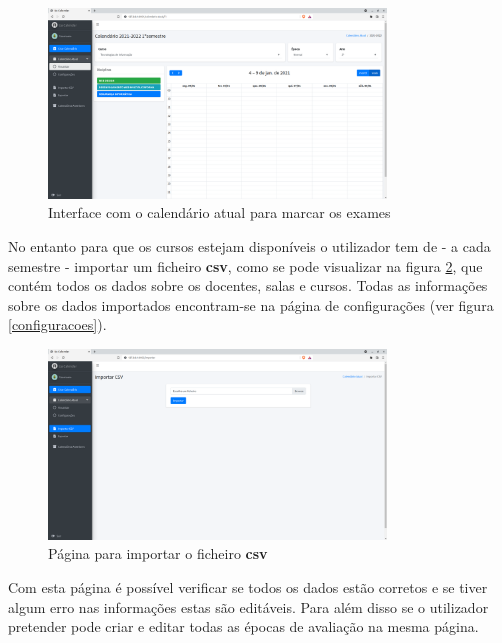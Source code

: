 \documentclass[11pt, twoside]{report}
\begin{document}
	\begin{figure}[H] 
		\centering 							\includegraphics[width=0.8\textwidth,height=0.8\textheight,keepaspectratio]{image/PrototipoAFNF/VerCalendarioAtual}
		\caption{Interface com o calendário atual para marcar os exames}
		\label{marcarExames}
	\end{figure}
	
	No entanto para que os cursos estejam disponíveis o utilizador tem de - a cada semestre - importar um ficheiro \textbf{csv}, como se pode visualizar na figura \ref{importarCSV}, que contém todos os dados sobre os docentes, salas e cursos.
	Todas as informações sobre os dados importados encontram-se na página de configurações (ver figura \ref{configuracoes}). 
	
	\begin{figure}[H] 
		\centering 							\includegraphics[width=0.8\textwidth,height=0.8\textheight,keepaspectratio]{image/PrototipoAFNF/Importar}
		\caption{Página para importar o ficheiro \textbf{csv}}
		\label{importarCSV}
	\end{figure}

	Com esta página é possível verificar se todos os dados estão corretos e se tiver algum erro nas informações estas são editáveis.
	Para além disso se o utilizador pretender pode criar e editar todas as épocas de avaliação na mesma página.  
	
\end{document}
